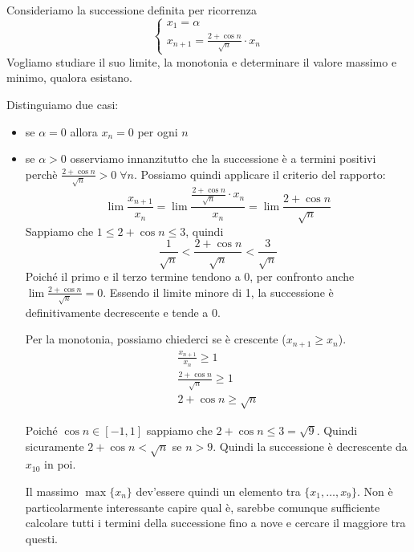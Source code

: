 \begin{example}
Consideriamo la successione definita per ricorrenza
\begin{equation*}
\begin{cases}
x_1 = \alpha \\
x_{n+1} = \frac{2 + \cos n}{\sqrt{n}} \cdot x_n
\end{cases}
\end{equation*}
Vogliamo studiare il suo limite, la monotonia e determinare il valore massimo e minimo, qualora esistano.

Distinguiamo due casi:
\begin{itemize}
\item se $\alpha = 0$ allora $x_n = 0$ per ogni $n$
\item se $\alpha > 0$ osserviamo innanzitutto che la successione è a termini positivi perchè $\frac{2+\cos n}{\sqrt{n}} > 0 \; \forall n$. Possiamo quindi applicare il criterio del rapporto:
\begin{equation*}
\lim \frac{x_{n+1}}{x_n} = \lim \frac{\frac{2 + \cos n}{\sqrt{n}} \cdot x_n}{x_n} = \lim \frac{2 + \cos n}{\sqrt{n}}
\end{equation*}
Sappiamo che $1 \le 2 + \cos n \le 3$, quindi
\begin{equation*}
\frac{1}{\sqrt{n}} < \frac{2+\cos n}{\sqrt{n}} < \frac{3}{\sqrt{n}}
\end{equation*}
Poiché il primo e il terzo termine tendono a 0, per confronto anche $\lim \frac{2+\cos n}{\sqrt{n}} = 0$. Essendo il limite minore di 1, la successione è definitivamente decrescente e tende a 0.

Per la monotonia, possiamo chiederci se è crescente ($x_{n+1} \ge x_n$).
\begin{gather*}
\frac{x_{n+1}}{x_n} \ge 1 \\
\frac{2 + \cos n}{\sqrt{n}} \ge 1 \\
2 + \cos n \ge \sqrt{n}
\end{gather*}

Poiché $\cos n \in [-1, 1]$ sappiamo che $2 + \cos n \le 3 = \sqrt{9}$. Quindi sicuramente $2 + \cos n < \sqrt{n}$ se $n > 9$. Quindi la successione è decrescente da $x_{10}$ in poi.

Il massimo $\max \{x_n\}$ dev'essere quindi un elemento tra $\{x_1, \ldots, x_9\}$. Non è particolarmente interessante capire qual è, sarebbe comunque sufficiente calcolare tutti i termini della successione fino a nove e cercare il maggiore tra questi.
\end{itemize}
\end{example}

